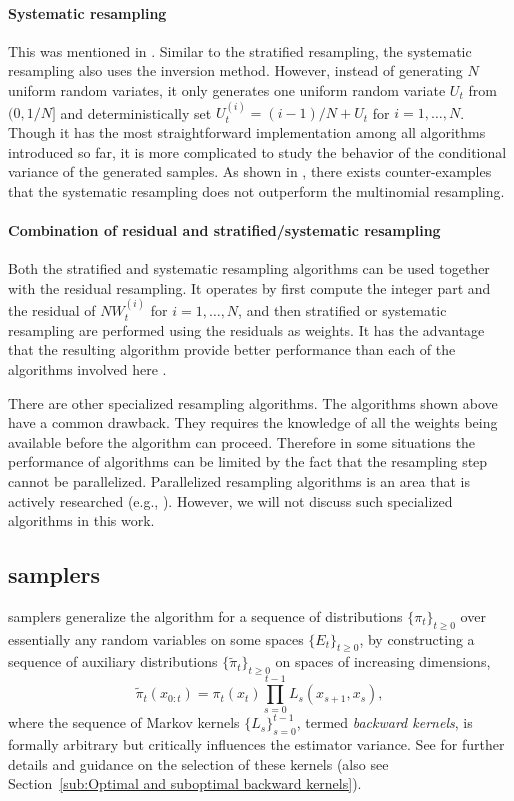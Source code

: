 \paragraph{Systematic resampling} This was mentioned in \cite{Whitley:1994vx}.
Similar to the stratified resampling, the systematic resampling also uses the
inversion method. However, instead of generating $N$ uniform random variates,
it only generates one uniform random variate $U_t$ from $(0, 1/N]$ and
deterministically set $U_t^{(i)} = (i - 1)/N + U_t$ for $i = 1,\dots,N$.
Though it has the most straightforward implementation among all algorithms
introduced so far, it is more complicated to study the behavior of the
conditional variance of the generated samples. As shown in \cite{Douc:2005wa},
there exists counter-examples that the systematic resampling does not
outperform the multinomial resampling.

\paragraph{Combination of residual and stratified/systematic resampling} Both
the stratified and systematic resampling algorithms can be used together with
the residual resampling. It operates by first compute the integer part and the
residual of $NW_t^{(i)}$ for $i = 1,\dots,N$, and then stratified or
systematic resampling are performed using the residuals as weights. It has the
advantage that the resulting algorithm provide better performance than
each of the algorithms involved here \cite{Douc:2005wa}.

There are other specialized resampling algorithms. The algorithms shown above
have a common drawback. They requires the knowledge of all the weights being
available before the algorithm can proceed. Therefore in some situations the
performance of \smc algorithms can be limited by the fact that the resampling
step cannot be parallelized. Parallelized resampling algorithms is an area
that is actively researched (e.g., \cite{Jun:2011vx,Murray:2013vx}). However,
we will not discuss such specialized algorithms in this work.

\subsection[SMC samplers]{\protect\smc samplers}
\label{sub:SMC Samplers}

\smc samplers generalize the \sis algorithm for a sequence of distributions
$\{\pi_t\}_{t\ge0}$ over essentially any random variables on some spaces
$\{E_t\}_{t\ge0}$, by constructing a sequence of auxiliary distributions
$\{\tilde\pi_t\}_{t\ge0}$ on spaces of increasing dimensions,
\begin{equation}
  \tilde\pi_t(x_{0:t})=\pi_t (x_t) \prod_{s=0}^{t-1} L_s(x_{s+1},x_s),
\end{equation}
where the sequence of Markov kernels $\{L_s\}_{s=0}^{t-1}$, termed
\emph{backward kernels}, is formally arbitrary but critically influences the
estimator variance. See \cite{DelMoral:2006hc} for further details and
guidance on the selection of these kernels (also see Section~\ref{sub:Optimal
  and suboptimal backward kernels}).

